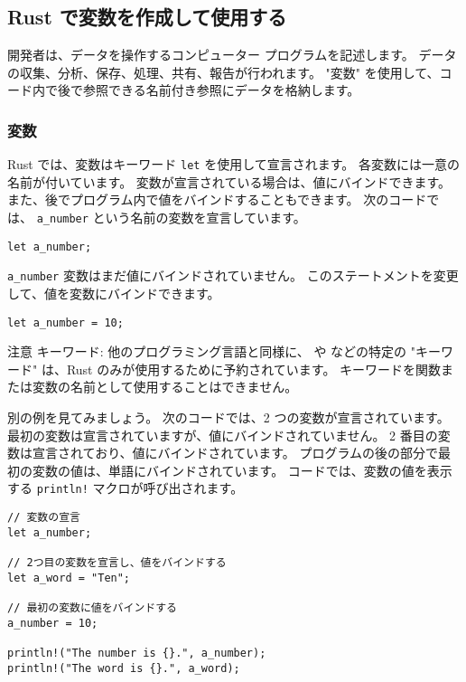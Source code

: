 \subsection{Rust で変数を作成して使用する}

開発者は、データを操作するコンピューター プログラムを記述します。 データの収集、分析、保存、処理、共有、報告が行われます。 "変数" を使用して、コード内で後で参照できる名前付き参照にデータを格納します。

\subsubsection{変数}

Rust では、変数はキーワード \texttt{let} を使用して宣言されます。 各変数には一意の名前が付いています。 変数が宣言されている場合は、値にバインドできます。また、後でプログラム内で値をバインドすることもできます。 次のコードでは、 \texttt{a\_number} という名前の変数を宣言しています。

\begin{lstlisting}[numbers=none]
let a_number;
\end{lstlisting}

\texttt{a\_number} 変数はまだ値にバインドされていません。 このステートメントを変更して、値を変数にバインドできます。

\begin{lstlisting}[numbers=none]
let a_number = 10;
\end{lstlisting}

\begin{itembox}[l]{注意}
キーワード: 他のプログラミング言語と同様に、 や などの特定の "キーワード" は、Rust のみが使用するために予約されています。 キーワードを関数または変数の名前として使用することはできません。
\end{itembox}

別の例を見てみましょう。 次のコードでは、2 つの変数が宣言されています。 最初の変数は宣言されていますが、値にバインドされていません。 2 番目の変数は宣言されており、値にバインドされています。 プログラムの後の部分で最初の変数の値は、単語にバインドされています。 コードでは、変数の値を表示する \texttt{println!} マクロが呼び出されます。


\begin{lstlisting}[numbers=none]
// 変数の宣言
let a_number;
    
// 2つ目の変数を宣言し、値をバインドする
let a_word = "Ten";
    
// 最初の変数に値をバインドする
a_number = 10;

println!("The number is {}.", a_number);
println!("The word is {}.", a_word);
\end{lstlisting}

